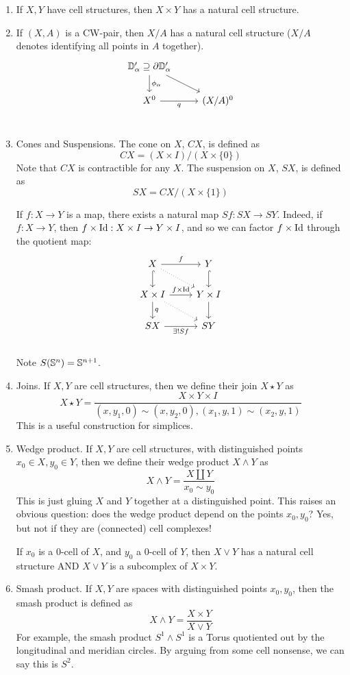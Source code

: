 \documentclass[x11names,reqno,14pt]{extarticle}
\begin{document}
\begin{enumerate}

\item If $X, Y$ have cell structures, then $X \times Y$ has a natural cell structure.

\item If $(X, A)$ is a CW-pair, then $X/A$ has a natural cell structure ($X/A$ denotes identifying all points in $A$ together). 
\[
\begin{tikzcd}
\mbb{D}'_\alpha \supseteq \del\mbb{D}'_\alpha \ar[d, "\phi_\alpha"] \ar[dr] & \\
X^0 \ar[r, "q"'] & (X/A)^0 \\
\end{tikzcd}
\] 

\item Cones and Suspensions. The cone on $X$, $CX$, is defined as
\[
CX = (X\times I)/(X\times\{0\})
\]
Note that $CX$ is contractible for any $X$. The suspension on $X$, $SX$, is defined as 
\[
SX = CX/(X\times\{1\})
\]

If $f:X\to Y$ is a map, there exists a natural map $Sf:SX\to SY$. Indeed, if $f:X\to Y$, then $f\times\operatorname{\mathrm{Id}}:X\times I\to Y\times I$, and so we can factor $f \times \operatorname{\mathrm{Id}}$ through the quotient map:
\[
\begin{tikzcd}
X\ar[r, "f"]\ar[d, hook]\ar[dr, dotted] & Y\ar[d, hook] \\
X\times I\ar[d,"q"]\ar[r, "f\times\Id"]\ar[dr, dotted] & Y\times I \ar[d] \\
SX\ar[r, "\exists!Sf"'] & SY \\
\end{tikzcd}
\]
Note $S(\mathbb{S}^n) = \mathbb{S}^{n + 1}$.

\item Joins. If $X, Y$ are cell structures, then we define their join $X\star Y$ as
\[
X\star Y = \frac{X\times Y \times I}{(x, y_1, 0) \sim (x, y_2, 0), (x_1, y, 1) \sim (x_2, y, 1)}
\]
This is a useful construction for simplices. 

\item Wedge product. If $X, Y$ are cell structures, with distinguished points $x_0 \in X, y_0 \in Y$, then we define their wedge product $X \wedge Y$ as
\[
X\wedge Y = \frac{X\coprod Y}{x_0 \sim y_0}
\]
This is just gluing $X$ and $Y$ together at a distinguished point. This raises an obvious question: does the wedge product depend on the points $x_0, y_0$? Yes, but not if they are (connected) cell complexes!

If $x_0$ is a 0-cell of $X$, and $y_0$ a 0-cell of $Y$, then $X \vee Y$ has a natural cell structure AND $X\vee Y$ is a subcomplex of $X\times Y$.

\item Smash product. If $X, Y$ are spaces with distinguished points $x_0, y_0$, then the smash product is defined as 
\[
X\wedge Y = \frac{X\times Y}{X\vee Y}
\]
For example, the smash product $S^1\wedge S^1$ is a Torus quotiented out by the longitudinal and meridian circles. By arguing from some cell nonsense, we can say this is $S^2$. 

\end{enumerate}
\end{document}
